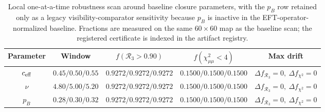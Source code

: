 \documentclass[aps,prd,onecolumn,notitlepage,nofootinbib,superscriptaddress,11pt,floatfix]{revtex4-2}
\begin{document}
\begin{table}[t]
\centering
\caption{Local one-at-a-time robustness scan around baseline closure parameters, with the $p_B$ row retained only as a legacy visibility-comparator sensitivity because $p_B$ is inactive in the EFT-operator-normalized baseline. Fractions are measured on the same $60\times60$ map as the baseline scan; the registered certificate is indexed in the artifact registry.}
\label{tab:core_param_robustness}
\scriptsize
\begin{tabular}{ccccc}
\hline\hline
Parameter & Window & $f(\mathcal{R}_3>0.90)$ & $f(\chi^2_{\mu\mu}<4)$ & Max drift \\
\hline
$c_{\rm eff}$ & $0.45/0.50/0.55$ & $0.9272/0.9272/0.9272$ & $0.1500/0.1500/0.1500$ & $\Delta f_{\mathcal{R}_3}=0,\ \Delta f_{\chi^2}=0$ \\
$\nu$ & $4.80/5.00/5.20$ & $0.9272/0.9272/0.9272$ & $0.1500/0.1500/0.1500$ & $\Delta f_{\mathcal{R}_3}=0,\ \Delta f_{\chi^2}=0$ \\
$p_B$ & $0.28/0.30/0.32$ & $0.9272/0.9272/0.9272$ & $0.1500/0.1500/0.1500$ & $\Delta f_{\mathcal{R}_3}=0,\ \Delta f_{\chi^2}=0$ \\
\hline\hline
\end{tabular}
\end{table}
\end{document}
